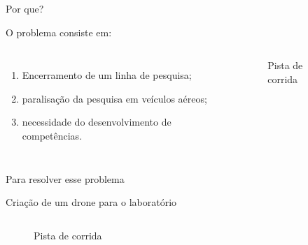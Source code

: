 \begin{frame}[t]{Por que?}
    \transdissolve[duration=0.5]

    O problema consiste em:
    \begin{columns}[t]
        \begin{enumerate}
            \item Encerramento de um linha de pesquisa;
            \item paralisação da pesquisa em veículos aéreos;
            \item necessidade do desenvolvimento de competências.
        \end{enumerate}
        \begin{center}
            \begin{figure}
                \caption{Pista de corrida \cite{agostini2007}}
            \end{figure}
        \end{center}
    \end{columns}
\end{frame}
\begin{frame}[t]{Para resolver esse problema}
    \transdissolve[duration=0.5]

    Criação de um drone para o laboratório
    \newline
    \begin{columns}[t]
        \begin{center}
            \begin{figure}
                \caption{Pista de corrida \cite{agostini2007}}
            \end{figure}
        \end{center}
    \end{columns}
\end{frame}

